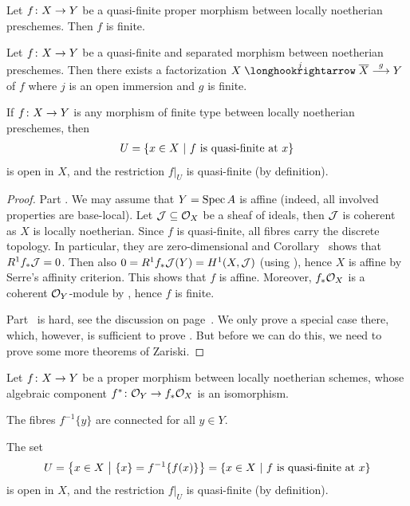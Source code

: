 \documentclass[a4paper,parskip=half,numbers=enddot, DIV=12]{scrreprt}
\begin{document}
\begin{thm}
	\begin{alphanumerate}
		\item {}Let $f\colon X\morphism Y$ be a quasi-finite proper morphism between locally noetherian preschemes. Then $f$ is finite.
		\item Let $f\colon X\morphism Y$ be a quasi-finite and separated morphism between noetherian preschemes. Then there exists a factorization $X\monomorphism[j]\ov{X}\morphism[g]Y$ of $f$ where $j$ is an open immersion and $g$ is finite.
		\item If $f\colon X\morphism Y$ is any morphism of finite type between locally noetherian preschemes, then 
		\begin{align*}
			U=\left\{x\in X\ \middle|\  f\text{ is quasi-finite at }x\right\}
		\end{align*}
		is open in $X$, and the restriction $f|_U$ is quasi-finite (by definition).
	\end{alphanumerate}
\end{thm}
\begin{proof}
	Part . We may assume that $Y=\operatorname{Spec} A$ is affine (indeed, all involved properties are base-local). Let $\mathcal{J}\subseteq \mathcal{O}_X$ be a sheaf of ideals, then $\mathcal{J}$ is coherent as $X$ is locally noetherian. Since $f$ is quasi-finite, all fibres carry the discrete topology. In particular, they are zero-dimensional and Corollary~ shows that $R^1f_*\mathcal{J}=0$. Then also $0=R^1f_*\mathcal{J}(Y)=H^1(X,\mathcal{J})$ (using \cite[Proposition~1.5.1]{alggeo2}), hence $X$ is affine by Serre's affinity criterion. This shows that $f$ is affine. Moreover, $f_*\mathcal{O}_X$ is a coherent $\mathcal{O}_Y$-module by \cite[Theorem~5]{alggeo2}, hence $f$ is finite.
	
	Part~ is hard, see the discussion on page~\pageref{proof:discussionOfThm3}. We only prove a special case there, which, however, is sufficient to prove . But before we can do this, we need to prove some more theorems of Zariski.
\end{proof}
\begin{thm}
	Let $f\colon X\morphism Y$ be a proper morphism between locally noetherian schemes, whose algebraic component $f^*\colon \Oo_Y\morphism f_*\Oo_X$ is an isomorphism.
	\begin{alphanumerate}
		\item The fibres $f^{-1}\{y\}$ are connected for all $y\in Y$.
		\item The set
		\begin{align*}
			U=\left\{x\in X\ \middle|\  \{x\}=f^{-1}\{f(x)\}\right\}=\left\{x\in X\ \middle|\  f\text{ is quasi-finite at }x\right\}
		\end{align*}
		is open in $X$, and the restriction $f|_U$ is quasi-finite (by definition).
	\end{alphanumerate}
\end{thm}
\end{document}
